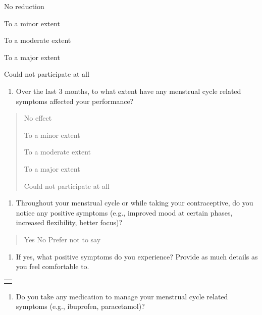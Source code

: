 No reduction

To a minor extent

To a moderate extent

To a major extent

Could not participate at all

\begin{enumerate}
\def\labelenumi{\arabic{enumi})}
\setcounter{enumi}{11}
\item
  Over the last 3 months, to what extent have any menstrual cycle
  related symptoms affected your performance?
\end{enumerate}

\begin{quote}
No effect

To a minor extent

To a moderate extent

To a major extent

Could not participate at all
\end{quote}

\begin{enumerate}
\def\labelenumi{\arabic{enumi})}
\setcounter{enumi}{12}
\item
  Throughout your menstrual cycle or while taking your contraceptive, do
  you notice any positive symptoms (e.g., improved mood at certain
  phases, increased flexibility, better focus)?
\end{enumerate}

\begin{quote}
Yes No Prefer not to say
\end{quote}

\begin{enumerate}
\def\labelenumi{\alph{enumi}.}
\item
  If yes, what positive symptoms do you experience? Provide as much
  details as you feel comfortable to.
\end{enumerate}

\begin{longtable}[]{@{}
  >{\raggedright\arraybackslash}p{}@{}}
\toprule\noalign{}
\begin{minipage}[b]{\linewidth}\raggedright
\end{minipage} \\
\midrule\noalign{}
\endhead
\bottomrule\noalign{}
\endlastfoot
\end{longtable}

\begin{enumerate}
\def\labelenumi{\arabic{enumi})}
\setcounter{enumi}{13}
\item
  Do you take any medication to manage your menstrual cycle related
  symptoms (e.g., ibuprofen, paracetamol)?
\end{enumerate}

